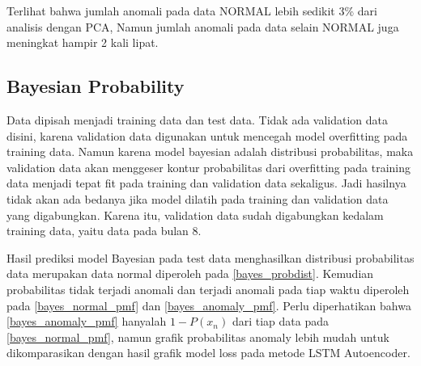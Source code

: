     Terlihat bahwa jumlah anomali pada data NORMAL lebih sedikit 3\% dari analisis dengan PCA, Namun jumlah anomali pada data selain NORMAL juga meningkat hampir 2 kali lipat.

\subsection{Bayesian Probability}

Data dipisah menjadi training data dan test data. Tidak ada validation data disini, karena validation data digunakan untuk mencegah model overfitting pada training data. Namun karena model bayesian adalah distribusi probabilitas, maka validation data akan menggeser kontur probabilitas dari overfitting pada training data menjadi tepat fit pada training dan validation data sekaligus. Jadi hasilnya tidak akan ada bedanya jika model dilatih pada training dan validation data yang digabungkan. Karena itu, validation data sudah digabungkan kedalam training data, yaitu data pada bulan 8.

Hasil prediksi model Bayesian pada test data menghasilkan distribusi probabilitas data merupakan data normal diperoleh pada \ref{bayes_probdist}. Kemudian probabilitas tidak terjadi anomali dan terjadi anomali pada tiap waktu diperoleh pada \ref{bayes_normal_pmf} dan \ref{bayes_anomaly_pmf}. Perlu diperhatikan bahwa \ref{bayes_anomaly_pmf} hanyalah $ 1 - P(x_n) $ dari tiap data pada \ref{bayes_normal_pmf}, namun grafik probabilitas anomaly lebih mudah untuk dikomparasikan dengan hasil grafik model loss pada metode LSTM Autoencoder.

